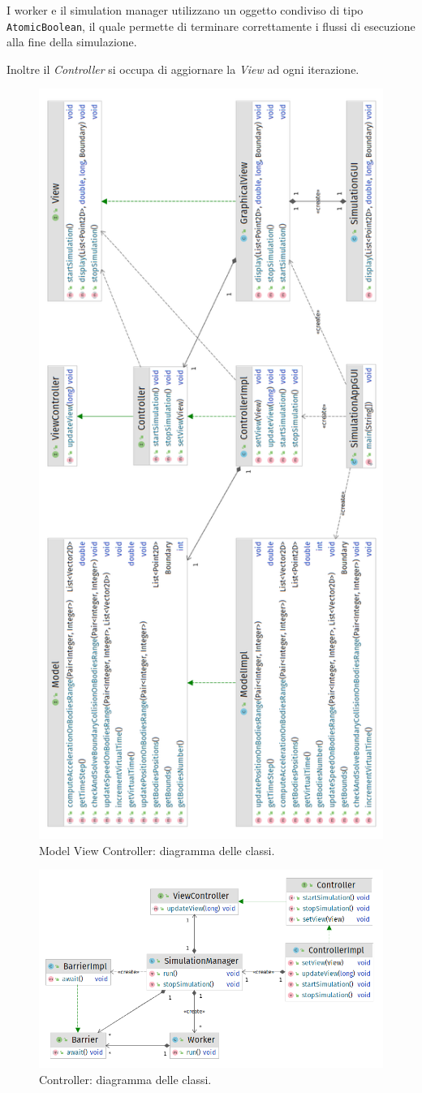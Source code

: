 \documentclass[12pt,a4paper,openright,twoside]{book}
\begin{document}
I worker e il simulation manager utilizzano un oggetto condiviso di tipo \texttt{AtomicBoolean}, 
il quale permette di terminare correttamente i flussi di esecuzione alla fine della simulazione.

Inoltre il \textit{Controller} si occupa di aggiornare la \textit{View} ad ogni iterazione.

\begin{figure}
	\centering
	\includegraphics[width=0.6\linewidth]{figures/MVC-class-diagram.png}
	\caption{Model View Controller: diagramma delle classi.}
	\label{fig:mvc}
\end{figure}

\begin{figure}
	\centering
	\includegraphics[width=\linewidth]{figures/simulation-manager.png}
	\caption{Controller: diagramma delle classi.}
	\label{fig:SimulatioManager}
\end{figure}
\end{document}
